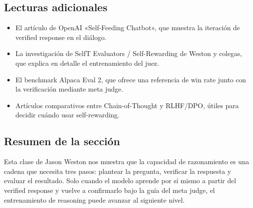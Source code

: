 \subsection{Lecturas adicionales}
\begin{itemize}
    \item El artículo de OpenAI «Self-Feeding Chatbot», que muestra la iteración de verified response en el diálogo.
    \item La investigación de SelfT Evaluators / Self-Rewarding de Weston y colegas, que explica en detalle el entrenamiento del juez.
    \item El benchmark Alpaca Eval 2, que ofrece una referencia de win rate junto con la verificación mediante meta judge.
    \item Artículos comparativos entre Chain-of-Thought y RLHF/DPO, útiles para decidir cuándo usar self-rewarding.
\end{itemize}

\subsection{Resumen de la sección}
Esta clase de Jason Weston nos muestra que la capacidad de razonamiento es una cadena que necesita tres pasos: plantear la pregunta, verificar la respuesta y evaluar el resultado. Solo cuando el modelo aprende por sí mismo a partir del verified response y vuelve a confirmarlo bajo la guía del meta judge, el entrenamiento de reasoning puede avanzar al siguiente nivel.


